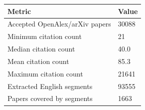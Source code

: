 \begin{tabular}{ll}
\toprule
Metric & Value \\
\midrule
Accepted OpenAlex/arXiv papers & 30088 \\
Minimum citation count & 21 \\
Median citation count & 40.0 \\
Mean citation count & 85.3 \\
Maximum citation count & 21641 \\
Extracted English segments & 93555 \\
Papers covered by segments & 1663 \\
\bottomrule
\end{tabular}
